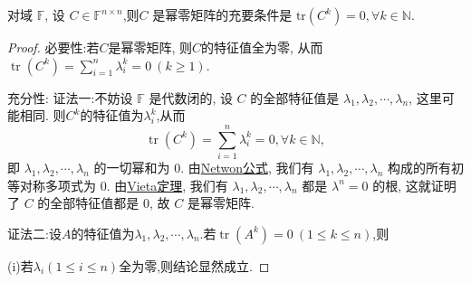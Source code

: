 \documentclass[../../main.tex]{subfiles}
\begin{document}
\begin{theorem}\label{theorem:幂零矩阵关于迹的充要条件}
对域 \( \mathbb{F} \), 设 \( C \in \mathbb{F}^{n \times n} \),则\( C \) 是幂零矩阵的充要条件是 \( \mathrm{tr}(C^k) = 0, \forall k \in \mathbb{N} \).
\end{theorem}
\begin{proof}
{\heiti 必要性:}若$C$是幂零矩阵, 则$C$的特征值全为零, 从而$\operatorname{tr}(C^k) = \sum_{i=1}^n \lambda_i^k = 0 \ (k \geqslant  1)$. 

{\heiti 充分性:}
{\color{blue}证法一:}不妨设 \( \mathbb{F} \) 是代数闭的, 设 \( C \) 的全部特征值是 \( \lambda_1, \lambda_2, \cdots, \lambda_n \), 这里可能相同. 则$C^k$的特征值为$\lambda_i^k$,从而
\[
\operatorname{tr}(C^k)=\sum_{i=1}^n \lambda_i^k = 0, \forall k \in \mathbb{N},
\]
即 \( \lambda_1, \lambda_2, \cdots, \lambda_n \) 的一切幂和为 0. 由\hyperref[theorem:Netwon公式]{Netwon公式}, 我们有 \( \lambda_1, \lambda_2, \cdots, \lambda_n \) 构成的所有初等对称多项式为 0. 由\hyperref[theorem:Vieta定理]{Vieta定理}, 我们有 \( \lambda_1, \lambda_2, \cdots, \lambda_n \) 都是 \( \lambda^n = 0 \) 的根, 这就证明了 \( C \) 的全部特征值都是 0, 故 \( C \) 是幂零矩阵.

{\color{blue}证法二:}设$A$的特征值为$\lambda_1, \lambda_2, \cdots, \lambda_n$.若$\operatorname{tr}(A^k) = 0 \ (1 \leqslant  k \leqslant  n)$,则

(i)若$\lambda_i(1\leqslant  i\leqslant  n)$全为零,则结论显然成立.


\end{proof}
\end{document}
